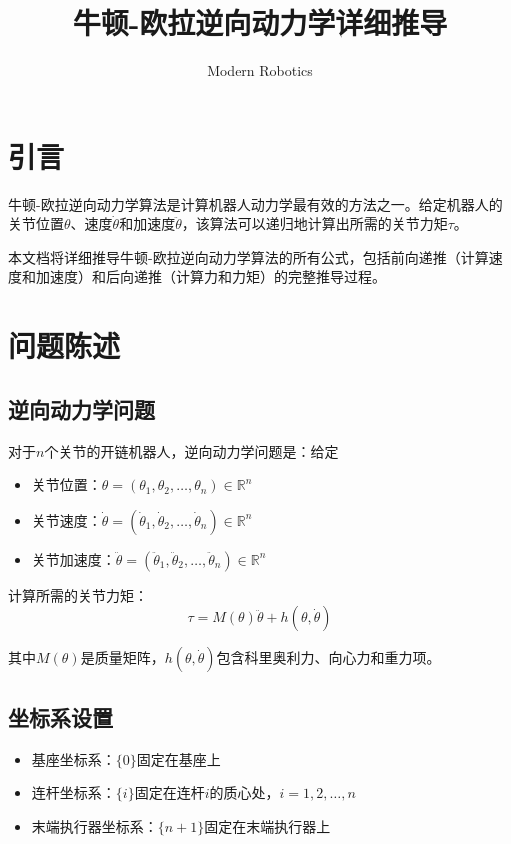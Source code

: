\documentclass[12pt,a4paper]{article}
\title{牛顿-欧拉逆向动力学详细推导}
\author{Modern Robotics}
\date{}
\begin{document}
\maketitle

\section{引言}

牛顿-欧拉逆向动力学算法是计算机器人动力学最有效的方法之一。给定机器人的关节位置$\theta$、速度$\dot{\theta}$和加速度$\ddot{\theta}$，该算法可以递归地计算出所需的关节力矩$\tau$。

本文档将详细推导牛顿-欧拉逆向动力学算法的所有公式，包括前向递推（计算速度和加速度）和后向递推（计算力和力矩）的完整推导过程。

\section{问题陈述}

\subsection{逆向动力学问题}

对于$n$个关节的开链机器人，逆向动力学问题是：给定
\begin{itemize}
\item 关节位置：$\theta = (\theta_1, \theta_2, \ldots, \theta_n) \in \mathbb{R}^n$
\item 关节速度：$\dot{\theta} = (\dot{\theta}_1, \dot{\theta}_2, \ldots, \dot{\theta}_n) \in \mathbb{R}^n$
\item 关节加速度：$\ddot{\theta} = (\ddot{\theta}_1, \ddot{\theta}_2, \ldots, \ddot{\theta}_n) \in \mathbb{R}^n$
\end{itemize}

计算所需的关节力矩：
\begin{equation}
\tau = M(\theta)\ddot{\theta} + h(\theta, \dot{\theta})
\label{eq:problem}
\end{equation}

其中$M(\theta)$是质量矩阵，$h(\theta, \dot{\theta})$包含科里奥利力、向心力和重力项。

\subsection{坐标系设置}

\begin{itemize}
\item 基座坐标系：$\{0\}$固定在基座上
\item 连杆坐标系：$\{i\}$固定在连杆$i$的质心处，$i = 1, 2, \ldots, n$
\item 末端执行器坐标系：$\{n+1\}$固定在末端执行器上
\end{itemize}
\end{document}
